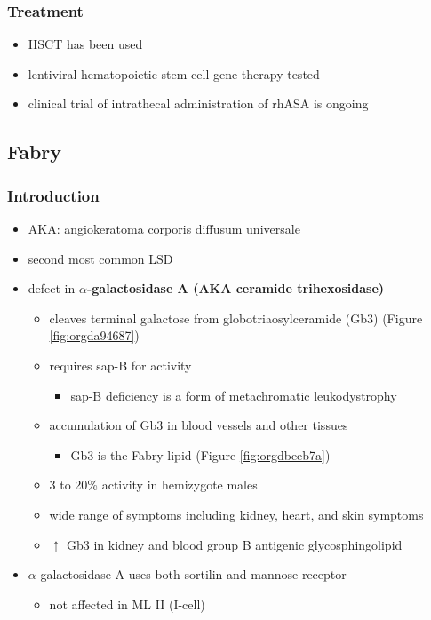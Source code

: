 \documentclass[12pt]{scrartcl}
\begin{document}
\subsubsection{Treatment}
\label{sec:orgad5006a}
\begin{itemize}
\item HSCT has been used
\item lentiviral hematopoietic stem cell gene therapy tested
\item clinical trial of intrathecal administration of rhASA is ongoing
\end{itemize}
\subsection{Fabry}
\label{sec:org9a352b5}
\subsubsection{Introduction}
\label{sec:orgd9d8bc9}
\begin{itemize}
\item AKA: angiokeratoma corporis diffusum universale
\item second most common LSD
\item defect in \textbf{\(\alpha\)-galactosidase A (AKA ceramide trihexosidase)}
\begin{itemize}
\item cleaves terminal galactose from globotriaosylceramide (Gb3)
(Figure \ref{fig:orgda94687})
\item requires sap-B for activity
\begin{itemize}
\item sap-B deficiency is a form of metachromatic leukodystrophy
\end{itemize}
\item accumulation of Gb3 in blood vessels and other tissues
\begin{itemize}
\item Gb3 is the Fabry lipid (Figure \ref{fig:orgdbeeb7a})
\end{itemize}
\item 3 to 20\% activity in hemizygote males
\item wide range of symptoms including kidney, heart, and skin symptoms
\item \(\uparrow\) Gb3 in kidney and blood group B antigenic glycosphingolipid
\end{itemize}
\item \(\alpha\)-galactosidase A uses both sortilin and mannose receptor
\begin{itemize}
\item not affected in ML II (I-cell)
\end{itemize}
\end{itemize}
\end{document}
